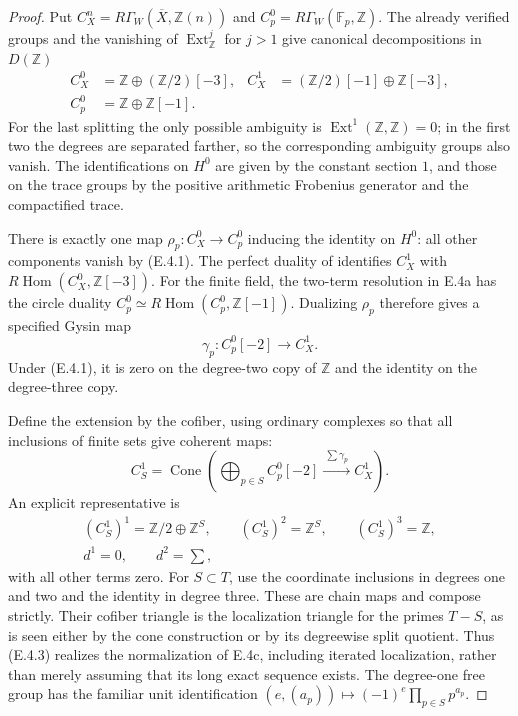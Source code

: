 \begin{proof}
Put $C_X^n=R\Gamma_W(\overline X,\mathbb Z(n))$ and
$C_p^0=R\Gamma_W(\mathbb F_p,\mathbb Z)$. The already verified groups
and the vanishing of $\operatorname{Ext}_{\mathbb Z}^j$ for $j>1$ give
canonical decompositions in $D(\mathbb Z)$
\[
 \begin{aligned}
 C_X^0&=\mathbb Z\oplus(\mathbb Z/2)[-3],&
 C_X^1&=(\mathbb Z/2)[-1]\oplus\mathbb Z[-3],\\
 C_p^0&=\mathbb Z\oplus\mathbb Z[-1].
 \end{aligned}
 \tag{E.4.1}
\]
For the last splitting the only possible ambiguity is
$\operatorname{Ext}^1(\mathbb Z,\mathbb Z)=0$; in the first two
the degrees are separated farther, so the corresponding ambiguity
groups also vanish. The identifications on $H^0$ are given by the
constant section $1$, and those on the trace groups by the positive
arithmetic Frobenius generator and the compactified trace.

There is exactly one map $\rho_p:C_X^0\to C_p^0$ inducing the identity
on $H^0$: all other components vanish by (E.4.1).
The perfect duality of \citet[Theorem 3.22]{D_FlachMorin2018} identifies
$C_X^1$ with $R\operatorname{Hom}(C_X^0,\mathbb Z[-3])$.
For the finite field, the two-term resolution in E.4a has the
circle duality
$C_p^0\simeq R\operatorname{Hom}(C_p^0,\mathbb Z[-1])$.
Dualizing $\rho_p$ therefore gives a specified Gysin map
\[
 \gamma_p:C_p^0[-2]\longrightarrow C_X^1.
 \tag{E.4.2}
\]
Under (E.4.1), it is zero on the degree-two copy of $\mathbb Z$
and the identity on the degree-three copy.

Define the extension by the cofiber, using ordinary complexes so that
all inclusions of finite sets give coherent maps:
\[
 C_S^1=\operatorname{Cone}
 \left(\bigoplus_{p\in S}C_p^0[-2]
                 \xrightarrow{\ \sum\gamma_p\ }C_X^1\right).
 \tag{E.4.3}
\]
An explicit representative is
\[
 \begin{gathered}
 (C_S^1)^1=\mathbb Z/2\oplus\mathbb Z^S,\qquad
 (C_S^1)^2=\mathbb Z^S,\qquad (C_S^1)^3=\mathbb Z,\\
 d^1=0,\qquad d^2=\sum ,
 \end{gathered}
 \tag{E.4.4}
\]
with all other terms zero. For $S\subset T$, use the coordinate
inclusions in degrees one and two and the identity in degree three.
These are chain maps and compose strictly. Their cofiber triangle
is the localization triangle for the primes $T-S$, as is seen either
by the cone construction or by its degreewise split quotient.
Thus (E.4.3) realizes the normalization of E.4c, including iterated
localization, rather than merely assuming that its long exact sequence
exists. The degree-one free group has the familiar unit identification
$(e,(a_p))\mapsto(-1)^e\prod_{p\in S}p^{a_p}$.
\end{proof}

